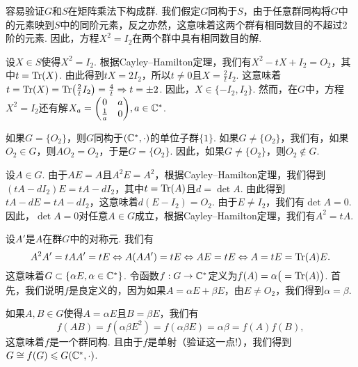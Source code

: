 \begin{solution}
  容易验证$G$和$S$在矩阵乘法下构成群. 我们假定$G$同构于$S$，由于任意群同构将$G$中的元素映到$S$中的同阶元素，反之亦然，这意味着这两个群有相同数目的不超过2阶的元素. 因此，方程$X^2=I_2$在两个群中具有相同数目的解.

  设$X\in S$使得$X^2=I_2$. 根据Cayley--Hamilton定理，我们有$X^2-tX+I_2=O_2$，其中$t=\operatorname{Tr}(X)$. 由此得到$tX=2I_2$，所以$t\ne0$且$X=\frac2tI_2$. 这意味着$t=\Tr(X)=\Tr\left(\frac2tI_2\right)=\frac4t\Rightarrow
  t=\pm2$. 因此，$X\in\{-I_2,I_2\}$. 然而，在$G$中，方程$X^2=I_2$还有解$X_a=\begin{pmatrix}
    0 & a \\
    \frac1a & 0
  \end{pmatrix},a\in\MC^\ast$.
\end{solution}

\begin{solution}
  如果$G=\{O_2\}$，则$G$同构于$(\mathbb C^\ast,\cdot)$的单位子群$\{1\}$. 如果$G\ne\{O_2\}$，我们有，如果$O_2\in G$，则$AO_2=O_2$，于是$G=\{O_2\}$. 因此，如果$G\ne\{O_2\}$，则$O_2\notin G$.

  设$A\in G$. 由于$AE=A$且$A^2E=A^2$，根据Cayley--Hamilton定理，我们得到$(tA-dI_2)E=tA-dI_2$，其中$t=\operatorname{Tr}(A)$且$d=\det A$. 由此得到$tA-dE=tA-dI_2$，这意味着$d(E-I_2)=O_2$. 由于$E\ne I_2$，我们有$\det A=0$. 因此，$\det A=0$对任意$A\in G$成立，根据Cayley--Hamilton定理，我们有$A^2=tA$.

  设$A'$是$A$在群$G$中的对称元. 我们有
  \[
    A^2A' = tAA' =tE \Leftrightarrow A(AA') = tE \Leftrightarrow AE = tE \Leftrightarrow
    A = tE = \operatorname{Tr}(A)E.
  \]
  这意味着$G\subset\{\alpha E,\alpha\in\mathbb C^\ast\}$. 令函数$f:G\to\mathbb C^\ast$定义为$f(A)=\alpha\big(=\operatorname{Tr}(A)\big)$. 首先，我们说明$f$是良定义的，因为如果$A=\alpha E+\beta E$，由$E\ne O_2$，我们得到$\alpha=\beta$.

  如果$A,B\in G$使得$A=\alpha E$且$B=\beta E$，我们有
  \[
    f(AB) = f(\alpha\beta E^2) = f(\alpha\beta E)
     = \alpha\beta = f(A)f(B),
  \]
  这意味着$f$是一个群同构. 且由于$f$是单射（验证这一点!），我们得到$G\cong f(G)\leqslant G(\mathbb C^\ast,\cdot)$.
\end{solution}

